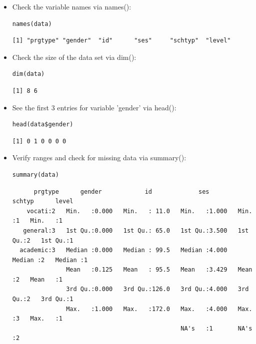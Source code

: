 \begin{frame}
\begin{itemize}
\newpage
		\item Check the variable names via \ttfamily names(): \normalfont 
\begin{lstlisting}
names(data)
\end{lstlisting}

{ \footnotesize
	\begin{verbatim}
[1] "prgtype" "gender"  "id"      "ses"     "schtyp"  "level"
	\end{verbatim}
}	
		\item Check the size of the data set via \ttfamily dim(): \normalfont 
\begin{lstlisting}
dim(data)
\end{lstlisting}

\begin{verbatim}
[1] 8 6
\end{verbatim}	
		\item See the first 3 entries for variable 'gender' via \ttfamily head(): \normalfont 
\begin{lstlisting}
head(data$gender)
\end{lstlisting}

\begin{verbatim}
[1] 0 1 0 0 0 0
\end{verbatim}	

\newpage
		\item Verify ranges and check for missing data via \ttfamily summary(): \normalfont 
\begin{lstlisting}
summary(data)
\end{lstlisting}

{ \tiny
	\begin{verbatim}
      prgtype      gender            id             ses            schtyp      level  
    vocati:2   Min.   :0.000   Min.   : 11.0   Min.   :1.000   Min.   :1   Min.   :1  
   general:3   1st Qu.:0.000   1st Qu.: 65.0   1st Qu.:3.500   1st Qu.:2   1st Qu.:1  
  academic:3   Median :0.000   Median : 99.5   Median :4.000   Median :2   Median :1  
               Mean   :0.125   Mean   : 95.5   Mean   :3.429   Mean   :2   Mean   :1  
               3rd Qu.:0.000   3rd Qu.:126.0   3rd Qu.:4.000   3rd Qu.:2   3rd Qu.:1  
               Max.   :1.000   Max.   :172.0   Max.   :4.000   Max.   :3   Max.   :1  
                                               NA's   :1       NA's   :2              
	\end{verbatim}	
}
	\end{itemize}
\end{frame}


